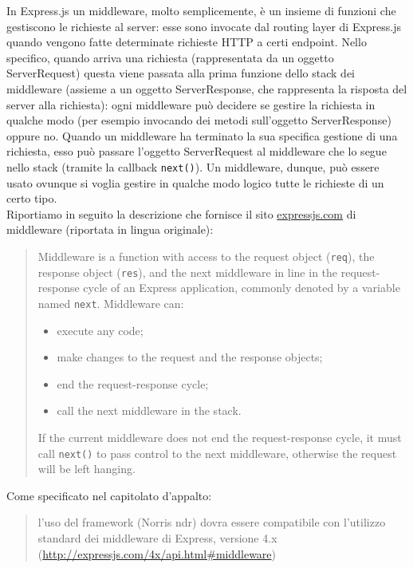		In Express.js un middleware, molto semplicemente, è un insieme di funzioni che gestiscono le richieste al server: esse sono invocate dal routing layer di Express.js quando vengono fatte determinate richieste HTTP a certi endpoint. Nello specifico, quando arriva una richiesta (rappresentata da un oggetto ServerRequest) questa viene passata alla prima funzione dello stack dei middleware (assieme a un oggetto ServerResponse, che rappresenta la risposta del server alla richiesta): ogni middleware può decidere se gestire la richiesta in qualche modo (per esempio invocando dei metodi sull'oggetto ServerResponse) oppure no. Quando un middleware ha terminato la sua specifica gestione di una richiesta, esso può passare l'oggetto ServerRequest al middleware che lo segue nello stack (tramite la callback \texttt{next()}). Un middleware, dunque, può essere usato ovunque si voglia gestire in qualche modo logico tutte le richieste di un certo tipo.\\
		Riportiamo in seguito la descrizione che fornisce il sito \url{expressjs.com} di middleware (riportata in lingua originale):
		\begin{quote}
			Middleware is a function with access to the request object (\texttt{req}), the response object (\texttt{res}), and the next middleware in line in the request-response cycle of an Express application, commonly denoted by a variable named \texttt{next}. Middleware can:
			\begin{itemize}
				\item execute any code;
				\item make changes to the request and the response objects;
				\item end the request-response cycle;
				\item call the next middleware in the stack.
			\end{itemize}
			If the current middleware does not end the request-response cycle, it must call \texttt{next()} to pass control to the next middleware, otherwise the request will be left hanging.
		\end{quote}
		Come specificato nel capitolato d'appalto:
		\begin{quote}
			l'uso del framework (Norris ndr) dovra essere compatibile con l’utilizzo standard dei middleware di Express, versione 4.x (\url{http://expressjs.com/4x/api.html#middleware})
		\end{quote}
